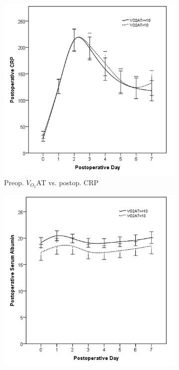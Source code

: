 \clearpage
\begin{figure}[p]
	\caption{Relationship between preoperative $\dot{V}_{O_2}$AT and postoperative inflammatory markers in the first week after pancreaticoduodenectomy.}
	\label{fig:sirs_at}
	\centering
	\begin{subfigure}{0.48\textwidth}
		\centering
		\includegraphics[width=\textwidth]{Figures/sirs_at_crp}
		\caption{Preop. $\dot{V}_{O_2}$AT vs. postop. CRP}
		\label{fig:sirs_at_crp}
	\end{subfigure}
	\hfill
	\begin{subfigure}{0.48\textwidth}
		\centering
		\includegraphics[width=\textwidth]{Figures/sirs_at_alb}

\end{subfigure}
\end{figure}
